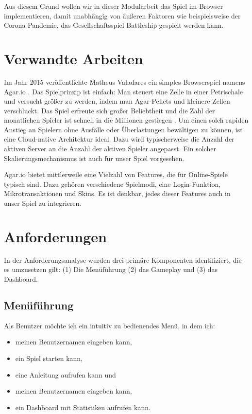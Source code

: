 \documentclass[a4paper, 10pt, conference]{IEEEtran}
\begin{document}
Aus diesem Grund wollen wir in dieser Modularbeit das Spiel im Browser implementieren, damit unabhängig von äußeren Faktoren wie beispielsweise der Corona-Pandemie, das Gesellschaftsspiel Battleship gespielt werden kann. 

\section{Verwandte Arbeiten}\label{sec:verwandte_arbeiten}

Im Jahr 2015 veröffentlichte Matheus Valadares ein simples Browserspiel namens Agar.io \cite{agario}. Das Spielprinzip ist einfach: Man steuert eine Zelle in einer Petrischale und versucht größer zu werden, indem man Agar-Pellets und kleinere Zellen verschluckt. Das Spiel erfreute sich großer Beliebtheit und die Zahl der monatlichen Spieler ist schnell in die Millionen gestiegen \cite{takahashi2017}. Um einen solch rapiden Anstieg an Spielern ohne Ausfälle oder Überlastungen bewältigen zu können, ist eine Cloud-native Architektur ideal. Dazu wird typischerweise die Anzahl der aktiven Server an die Anzahl der aktiven Spieler angepasst. Ein solcher Skalierungsmechanismus ist auch für unser Spiel vorgesehen.

Agar.io bietet mittlerweile eine Vielzahl von Features, die für Online-Spiele typisch sind. Dazu gehören verschiedene Spielmodi, eine Login-Funktion, Mikrotransaktionen und Skins. Es ist denkbar, jedes dieser Features auch in unser Spiel zu integrieren.

\section{Anforderungen}\label{sec:anforderungen}

In der Anforderungsanalyse wurden drei primäre Komponenten identifiziert, die es umzusetzen gilt: (1) Die Menüführung (2) das Gameplay und (3) das Dashboard.


\subsection{Menüführung}
Als Benutzer möchte ich ein intuitiv zu bedienendes Menü, in dem ich:
\begin{itemize}
	\item meinen Benutzernamen eingeben kann,
	\item ein Spiel starten kann,
	\item eine Anleitung aufrufen kann und
	\item meinen Benutzernamen eingeben kann,
	\item ein Dashboard mit Statistiken aufrufen kann.
\end{itemize}
\end{document}
